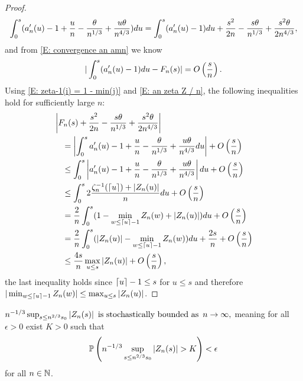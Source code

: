\begin{proof}
	\begin{equation}
	\int_{0}^s (a'_n(u) - 1 + \frac{u}{n} - \frac{\theta}{n^{1 / 3}} + \frac{u\theta}{n^{4 / 3}}) du  = \int_{0}^s(a'_n(u) - 1) du + \frac{s^2}{2n} - \frac{s\theta}{n^{1 / 3}} + \frac{s^2\theta}{2n^{4 / 3}},
	\end{equation}
	and from \eqref{E: convergence an amn} we know
	\begin{equation} \label{E: convergence amn An}
	|\int_{0}^s(a'_n(u) - 1) du - F_n(s)| = O\left(\frac{s}{n}\right).
	\end{equation}
	Using \eqref{E: zeta-1(i) = 1 - min(j)} and \eqref{E: an zeta Z / n}, the following inequalities hold for sufficiently large $n$:
	\begin{equation} \label{E: int an <= 4s/n maxZ + O()}
	\begin{aligned}
	&\left| F_n(s) + \frac{s^2}{2n} - \frac{s\theta}{n^{1 / 3}}  + \frac{s^2\theta}{2n^{4 / 3}}  \right| \\
	&\quad = \left| \int_{0}^s a'_n(u) - 1 + \frac{u}{n} - \frac{\theta}{n^{1 / 3}} + \frac{u\theta}{n^{4 / 3}} du \right| + O\left(\frac{s}{n}\right) \\
	&\quad \leq \int_{0}^s \left|a'_n(u) - 1 + \frac{u}{n} - \frac{\theta}{n^{1 / 3}} + \frac{u\theta}{n^{4 / 3}} \right| du + O\left(\frac{s}{n}\right) \\ 
	&\quad \leq \int_{0}^s 2 \frac{\zeta^{-1}_n(\lceil u\rceil) + |Z_n(u)|}{n} du + O\left(\frac{s}{n}\right)\\ 
	&\quad = \frac{2}{n}  \int_{0}^s (1-\min_{w \leq \lceil u\rceil-1} Z_n(w)  + |Z_n(u)| )du + O\left(\frac{s}{n}\right)\\ 
	&\quad = \frac{2}{n}  \int_{0}^s (|Z_n(u)| - \min_{w \leq \lceil u\rceil-1} Z_n(w)) du + \frac{2s}{n} + O\left(\frac{s}{n}\right) \\ 
	&\quad \leq \frac{4s}{n} \max_{u \leq s} |Z_n(u)| + O\left(\frac{s}{n}\right),
	\end{aligned}
	\end{equation}
	the last inequality holds since $\lceil u\rceil-1 \leq s$ for $u\leq s$ 
	and therefore $|\min_{w \leq \lceil u\rceil-1}Z_n(w)| \leq \max_{u \leq s}|Z_n(u)|$.
\end{proof}


\begin{lemma} \label{L: Zn stoch bounded}
	\begin{math}
	n^{-1/3} \sup_{s \leq n^{2 / 3} s_0 } |Z_n(s)| 
	\enspace \text{is stochastically bounded as} \enspace n \rightarrow \infty,
	\end{math}
	meaning for all $\epsilon > 0$ exist $K > 0$ such that
	\begin{equation} \label{E: stoch bounded}
	\mathbb{P}\left( n^{-1/3} \sup_{s \leq n^{2 / 3} s_0 } |Z_n(s)| > K \right) < \epsilon
	\end{equation}
	for all $n \in \mathbb{N}$.
\end{lemma}


